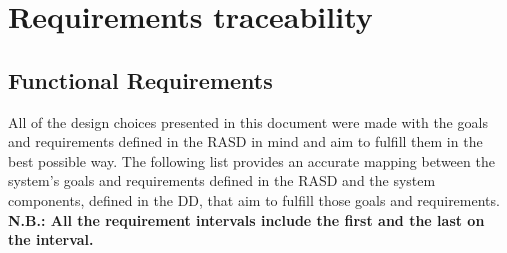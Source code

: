 \documentclass[12pt]{article}
\begin{document}
\section{Requirements traceability}
\subsection{Functional Requirements}
All of the design choices presented in this document were made with the goals and requirements defined in the RASD in mind and aim to fulfill them in the best possible way. The following list provides an accurate mapping between the system's goals and requirements defined in the RASD and the system components, defined in the DD, that aim to fulfill those goals and requirements.
\newline \textbf{N.B.: All the requirement intervals include the first and the last on the interval.}
\end{document}
